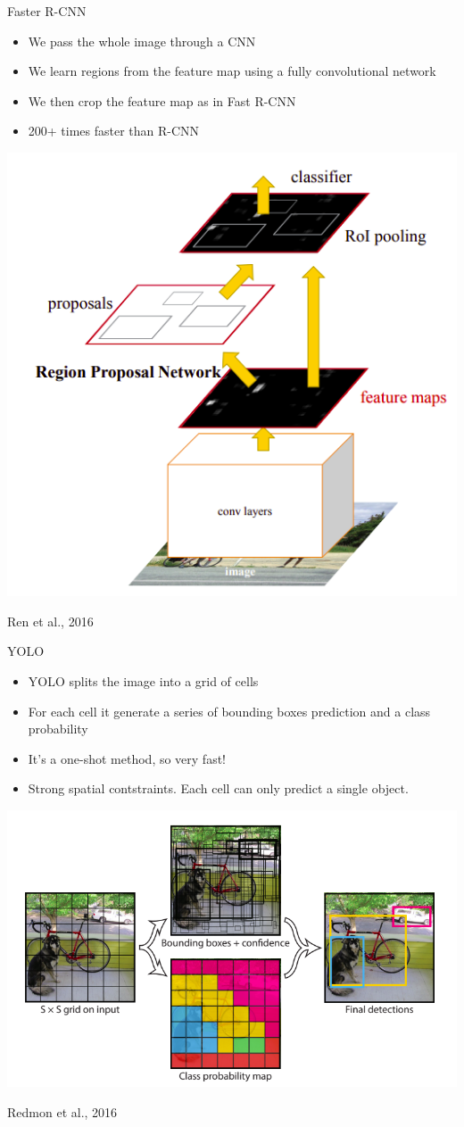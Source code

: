 \documentclass[9pt, aspectratio=169]{beamer}
\begin{document}
\begin{frame}
    {Faster R-CNN}
    \begin{itemize}
        \item We pass the whole image through a CNN
        \item We learn regions from the feature map using a fully convolutional network
        \item We then crop the feature map as in Fast R-CNN
        \item 200+ times faster than R-CNN
    \end{itemize}
    \centering
    \includegraphics[width=.4\textwidth]{Ren_2016_faster_rcnn.png}

    \footnotesize
    Ren et al., 2016
\end{frame}

\begin{frame}
    {YOLO}
    \begin{itemize}
        \item YOLO splits the image into a grid of cells
        \item For each cell it generate a series of bounding boxes prediction and a class probability
        \item It's a one-shot method, so very fast!
        \item Strong spatial contstraints. Each cell can only predict a single object.
    \end{itemize}
    \centering
    \includegraphics[width=.6\textwidth]{Redmon2016_YOLO.png}

    \footnotesize
    Redmon et al., 2016
\end{frame}
\end{document}
